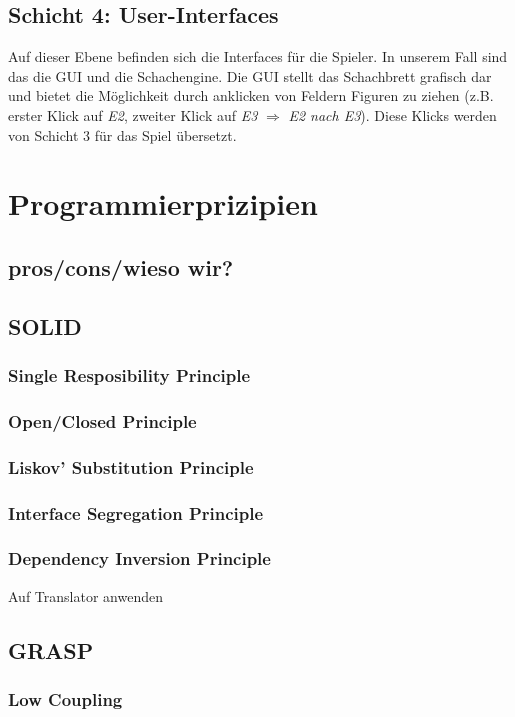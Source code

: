 \documentclass{article}
\begin{document}
\subsection{Schicht 4: User-Interfaces}
Auf dieser Ebene befinden sich die Interfaces für die Spieler. In unserem Fall sind das die GUI und die Schachengine. %
Die GUI stellt das Schachbrett grafisch dar und bietet die Möglichkeit durch anklicken von Feldern Figuren zu ziehen (z.B. erster Klick auf \textit{E2}, zweiter Klick auf \textit{E3} $\Rightarrow$ \textit{E2 nach E3}). Diese Klicks werden von Schicht 3 für das Spiel übersetzt.

\section{Programmierprizipien}
\subsection{pros/cons/wieso wir?}
\subsection{SOLID}
\subsubsection{Single Resposibility Principle}
\subsubsection{Open/Closed Principle}
\subsubsection{Liskov' Substitution Principle}
\subsubsection{Interface Segregation Principle}
\subsubsection{Dependency Inversion Principle}
Auf Translator anwenden
\subsection{GRASP}
\subsubsection{Low Coupling}
\end{document}
